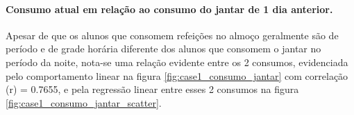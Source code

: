 \documentclass[	12pt, Times, openright, twoside, a4paper, english, brazil]{abntex2}
\begin{document}
                \paragraph{Consumo atual em relação ao consumo do jantar de 1 dia anterior.}
                
                    Apesar de que os alunos que consomem refeições no almoço geralmente são de período e  de grade horária diferente dos alunos que consomem o jantar no período da noite, nota-se uma relação evidente entre os 2 consumos, evidenciada pelo comportamento linear na figura \ref{fig:case1_consumo_jantar} com correlação (r) = 0.7655, e pela regressão linear entre esses 2 consumos na figura  \ref{fig:case1_consumo_jantar_scatter}.\newline
                    
                    {\begin{center} 
                    \begin{minipage}[c]{1.0\textwidth}
                    \begin{figure}[H]
                    \end{figure} 
                    \end{minipage}\hfill %
                    

\end{center}}
\end{document}
